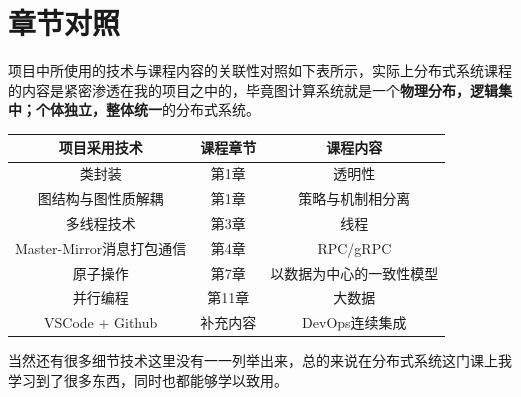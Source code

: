 \documentclass[logo,reportComp]{thesis}
\begin{document}



\newpage
\appendixconfig
\appendix
\section{章节对照}
\label{appendix:course}
项目中所使用的技术与课程内容的关联性对照如下表所示，实际上分布式系统课程的内容是紧密渗透在我的项目之中的，毕竟图计算系统就是一个\textbf{物理分布，逻辑集中；个体独立，整体统一}的分布式系统。

\begin{center}
\begin{tabular}{ccc}\hline
\textbf{项目采用技术} & \textbf{课程章节} & \textbf{课程内容}\\\hline
类封装 & 第1章 & 透明性\\
图结构与图性质解耦 & 第1章 & 策略与机制相分离\\
多线程技术 & 第3章 & 线程\\
Master-Mirror消息打包通信 & 第4章 & RPC/gRPC\\
原子操作 & 第7章 & 以数据为中心的一致性模型\\
并行编程 & 第11章 & 大数据\\
VSCode + Github & 补充内容 & DevOps连续集成\\\hline
\end{tabular}
\end{center}

当然还有很多细节技术这里没有一一列举出来，总的来说在分布式系统这门课上我学习到了很多东西，同时也都能够学以致用。
\end{document}
